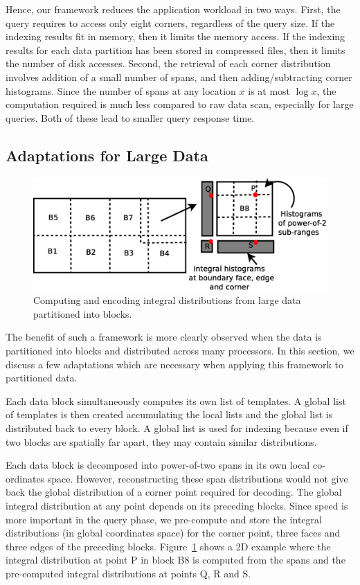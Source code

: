 Hence, our framework reduces the application workload in two ways. First, the query requires to access only eight corners, regardless of the query size. If the indexing results fit in memory, then it limits the memory access. If the indexing results for each data partition has been stored in compressed files, then it limits the number of disk accesses. Second, the retrieval of each corner distribution involves addition of a small number of spans, and then adding/subtracting corner histograms. Since the number of spans at any location $x$ is at most $\log x$, the computation required is much less compared to raw data scan, especially for large queries. Both of these lead to smaller query response time.
\remove
{
\subsection{Adaptations for Large Data}
\label{subsec:largedata}
\begin{figure}[!htb]
\centering
	\includegraphics[width = 0.9\linewidth, keepaspectratio = true]{images/eps/ih_blockeddata.eps}
	\caption{Computing and encoding integral distributions from large data partitioned into blocks.}	
	\label{fig:blockeddata}
\end{figure}
The benefit of such a framework is more clearly observed when the data is partitioned into blocks and distributed across many processors. In this section, we discuss a few adaptations which are necessary when applying this framework to partitioned data. 
\begin{packed_itemize}
\item Each data block simultaneously computes its own list of templates. A global list of templates is then created accumulating the local lists and the global list is distributed back to every block. A global list is used for indexing because even if two blocks are spatially far apart, they may contain similar distributions. 
\item Each data block is decomposed into power-of-two spans in its own local co-ordinates space. However, reconstructing these span distributions would not give back the global distribution of a corner point required for decoding. The global integral distribution at any point depends on its preceding blocks. Since speed is more important in the query phase, we pre-compute and store the integral distributions (in global coordinates space) for the corner point, three faces and three edges of the preceding blocks. Figure~\ref{fig:blockeddata} shows a 2D example where the integral distribution at point P in block B8 is computed from the spans and the pre-computed integral distributions at points Q, R and S.  
\end{packed_itemize}
}
 

